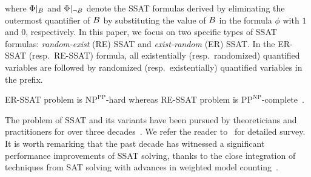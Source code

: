 where $ \Phi|_{B} $ and $ \Phi|_{\neg B} $ denote the SSAT formulas derived by eliminating the outermost quantifier of $ B $  by substituting the value of $ B $ in the formula $ \phi $ with $ 1 $ and $ 0 $, respectively. In this paper, we focus on two specific types of SSAT formulas:  \textit{random-exist} (RE) SSAT and \textit{exist-random} (ER) SSAT. In the ER-SSAT (resp.\ RE-SSAT) formula, all existentially (resp.\ randomized) quantified variables are followed by randomized (resp.\ existentially) quantified variables in the prefix.


\begin{remark}
	ER-SSAT problem is $\mathrm{NP}^{\mathrm{PP}}$-hard whereas RE-SSAT problem is $\mathrm{PP}^{\mathrm{NP}}$-complete~\cite{littman2001stochastic}.
\end{remark}



The problem of SSAT and its variants have been pursued by theoreticians and practitioners for over three decades~\cite{majercik2005dc,fremont2017maximum,huang2006combining}. We refer the reader to~\cite{lee2017solving,lee2018solving} for detailed survey. It is worth remarking that the past decade has witnessed a significant performance improvements of SSAT solving, thanks to the close integration of techniques from SAT solving with advances in weighted model counting~\cite{sang2004combining,chakraborty2013scalable,chakraborty2014distribution}. 



